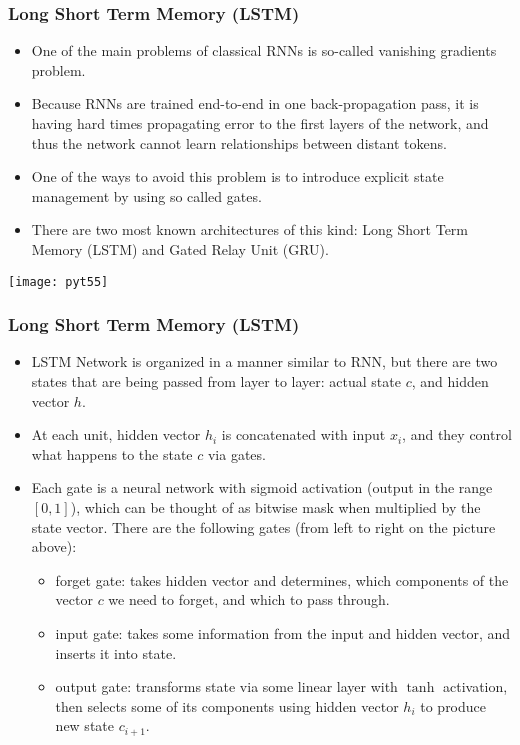 \begin{frame}[fragile] \frametitle{Long Short Term Memory (LSTM)}


\begin{itemize}
\item  One of the main problems of classical RNNs is so-called vanishing gradients problem. 
\item  Because RNNs are trained end-to-end in one back-propagation pass, it is having hard times propagating error to the first layers of the network, and thus the network cannot learn relationships between distant tokens. 
\item  One of the ways to avoid this problem is to introduce explicit state management by using so called gates. 
\item  There are two most known architectures of this kind: Long Short Term Memory (LSTM) and Gated Relay Unit (GRU).
\end{itemize}

\begin{center}
\texttt{[image: pyt55]}
\end{center}

\end{frame}

\begin{frame}[fragile] \frametitle{Long Short Term Memory (LSTM)}


\begin{itemize}
\item LSTM Network is organized in a manner similar to RNN, but there are two states that are being passed from layer to layer: actual state $c$, and hidden vector $h$. \item At each unit, hidden vector $h_i$ is concatenated with input $x_i$, and they control what happens to the state $c$ via gates. 
\item Each gate is a neural network with sigmoid activation (output in the range $[0,1]$), which can be thought of as bitwise mask when multiplied by the state vector. There are the following gates (from left to right on the picture above):

\begin{itemize}
\item forget gate: takes hidden vector and determines, which components of the vector $c$ we need to forget, and which to pass through. 
\item input gate: takes some information from the input and hidden vector, and inserts it into state.
\item output gate: transforms state via some linear layer with $\tanh$ activation, then selects some of its components using hidden vector $h_i$ to produce new state $c_{i+1}$.
\end{itemize}

\end{itemize}


\end{frame}

